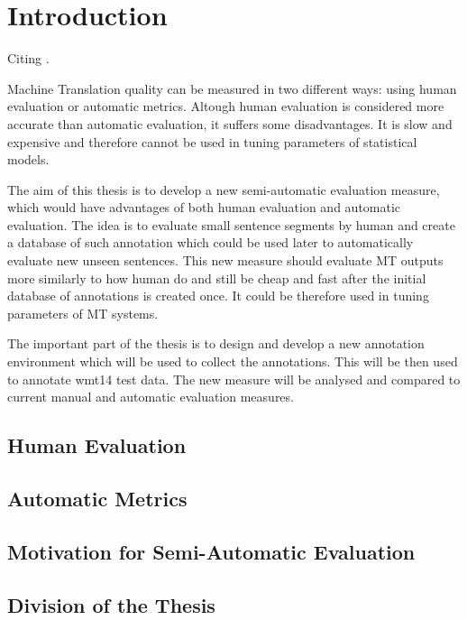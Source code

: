 \chapter{Introduction}

Citing \cite{wmt14-overview-paper}.

Machine Translation quality can be measured in two different ways: using human
evaluation or automatic metrics.  Altough human evaluation is considered more
accurate than automatic evaluation, it suffers some disadvantages.  It is slow
and expensive and therefore cannot be used in tuning parameters of statistical
models.

The aim of this thesis is to develop a new semi-automatic evaluation measure,
which would have advantages of both human evaluation and automatic evaluation.
The idea is to evaluate small sentence segments by human and create a database
of such annotation which could be used later to automatically evaluate new
unseen sentences.  This new measure should evaluate MT outputs more similarly
to how human do and still be cheap and fast after the initial database of
annotations is created once. It could be therefore used in tuning parameters of
MT systems.

The important part of the thesis is to design and develop a new annotation
environment which will be used to collect the annotations. This will be then used
to annotate wmt14 test data. The new measure will be analysed and compared to
current manual and automatic evaluation measures. 

\section{Human Evaluation}

\section{Automatic Metrics}

\section{Motivation for Semi-Automatic Evaluation}

\section{Division of the Thesis}






